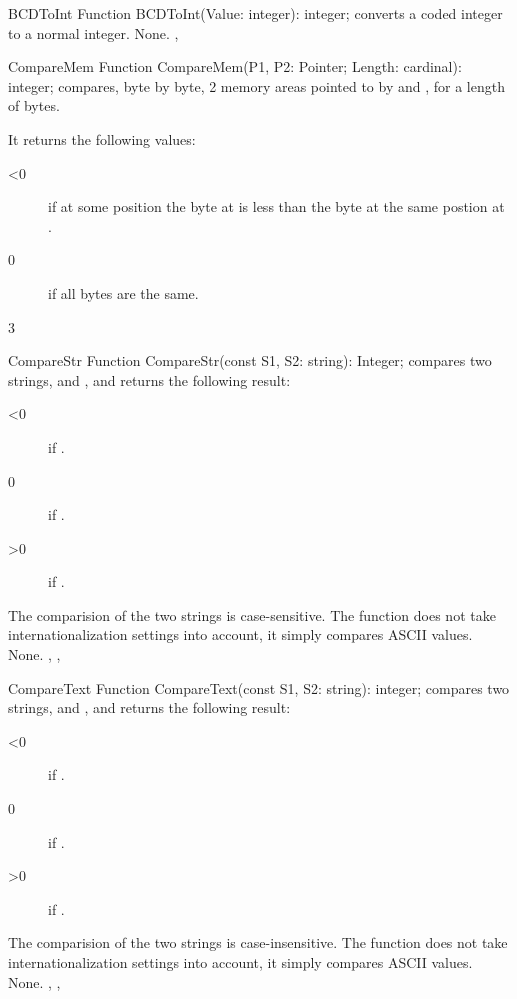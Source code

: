 
 
\begin{function}{BCDToInt}
\Declaration
Function BCDToInt(Value: integer): integer;
\Description
{} converts a  coded integer to a normal integer.
\Errors
None.
\SeeAlso
{}, 
\end{function}



 
\begin{function}{CompareMem}
\Declaration
Function CompareMem(P1, P2: Pointer; Length: cardinal): integer;
\Description
{} compares, byte by byte,  2 memory areas pointed 
to by  and , for a length of  bytes. 

It returns the following values:
\begin{description}
\item[<0] if at some position the byte at  is less than the byte at the
same postion at .
\item[0] if all  bytes are the same.
\item[3]
\end{description}
\Errors
\SeeAlso
\end{function}

 
\begin{function}{CompareStr}
\Declaration
Function CompareStr(const S1, S2: string): Integer;
\Description
{} compares two strings,  and , 
and returns the following
result:
\begin{description}
\item[<0]  if .
\item[0]  if .
\item[>0]  if .
\end{description}
The comparision of the two strings is case-sensitive.
The function does not take internationalization settings into account, it
simply compares ASCII values.
\Errors
None.
\SeeAlso
{}, , 
\end{function}



\begin{function}{CompareText}
\Declaration
Function CompareText(const S1, S2: string): integer;
\Description
{} compares two strings,  and , 
and returns the following
result:
\begin{description}
\item[<0]  if .
\item[0]  if .
\item[>0]  if .
\end{description}
The comparision of the two strings is case-insensitive.
The function does not take internationalization settings into account, it
simply compares ASCII values.
\Errors
None.
\SeeAlso
{}, , 
\end{function}

